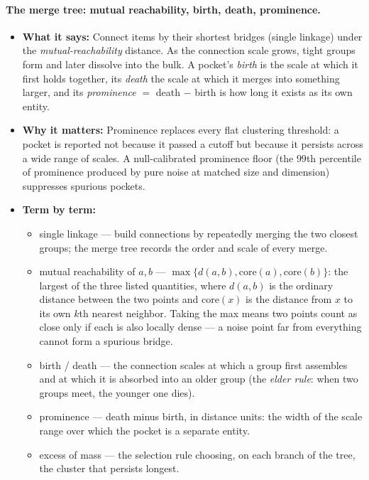 \documentclass[11pt,letterpaper]{article}
\begin{document}
\paragraph{The merge tree: mutual reachability, birth, death, prominence.}
\begin{itemize}
  \item \textbf{What it says:} Connect items by their shortest bridges
  (single linkage) under the \emph{mutual-reachability} distance. As the
  connection scale grows, tight groups form and later dissolve into the
  bulk. A pocket's \emph{birth} is the scale at which it first holds
  together, its \emph{death} the scale at which it merges into something
  larger, and its \emph{prominence} $=$ death $-$ birth is how long it
  exists as its own entity.
  \item \textbf{Why it matters:} Prominence replaces every flat clustering
  threshold: a pocket is reported not because it passed a cutoff but
  because it persists across a wide range of scales. A null-calibrated
  prominence floor (the $99$th percentile of prominence produced by pure
  noise at matched size and dimension) suppresses spurious pockets.
  \item \textbf{Term by term:}
  \begin{itemize}
    \item single linkage --- build connections by repeatedly merging the
    two closest groups; the merge tree records the order and scale of
    every merge.
    \item mutual reachability of $a, b$ --- $\max\{d(a,b),
    \mathrm{core}(a), \mathrm{core}(b)\}$: the largest of the three listed
    quantities, where $d(a,b)$ is the ordinary distance between the two
    points and $\mathrm{core}(x)$ is the distance from $x$ to its own
    $k$th nearest neighbor. Taking the max means two points count as close
    only if each is also locally dense --- a noise point far from
    everything cannot form a spurious bridge.
    \item birth / death --- the connection scales at which a group first
    assembles and at which it is absorbed into an older group (the
    \emph{elder rule}: when two groups meet, the younger one dies).
    \item prominence --- death minus birth, in distance units: the width of
    the scale range over which the pocket is a separate entity.
    \item excess of mass --- the selection rule choosing, on each branch of
    the tree, the cluster that persists longest.
  \end{itemize}
\end{itemize}
\end{document}
